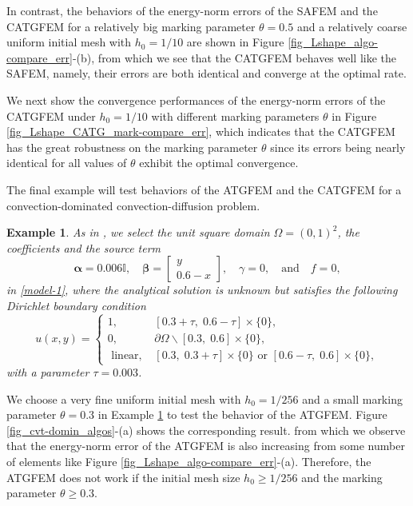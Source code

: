 \documentclass[preprint,times]{elsarticle}%
\newtheorem{example}{Example}[section]
\numberwithin{algorithm}{section}
\numberwithin{equation}{section}
\newcommand{\valpha}{\boldsymbol{\alpha}}
\newcommand{\vbeta}{\boldsymbol{\beta}}
\newcommand{\mbI}{\mathbb{I}}
\def\geq{\geqslant}
\begin{document}
In contrast, the behaviors of the energy-norm errors of the SAFEM and the CATGFEM for a relatively big marking parameter $\theta = 0.5$ and a relatively coarse uniform initial mesh with $h_0 = 1/10$ are shown in Figure \ref{fig_Lshape_algo-compare_err}-(b), from which we see that the CATGFEM behaves well like the SAFEM, namely, their errors are both identical and converge at the optimal rate.

We next show the convergence performances of the energy-norm errors of the CATGFEM under $h_0 = 1/10$ with different marking parameters $\theta$ in Figure \ref{fig_Lshape_CATG_mark-compare_err}, which indicates that the CATGFEM has the great robustness on the marking parameter $\theta$ since its errors being nearly identical for all values of $\theta$ exhibit the optimal convergence.



The final example will test behaviors of the ATGFEM and the CATGFEM for a convection-dominated convection-diffusion problem. 

	\begin{example}\label{test_cvt-domin}	
	As in \cite[Example 6.2]{ChenHXXuXJ10:4492}, we select the unit square domain $\Omega = (0,1)^2$, the coefficients and the source term 
		\begin{equation*}
			\valpha =0.006\mbI,
			\quad 
			\vbeta = \left[\begin{array}{c}
				y \\
				0.6-x
			\end{array}\right], 
			\quad
			\gamma = 0, \quad\text{and}\quad f = 0,   
		\end{equation*}
in \eqref{model-1}, where the analytical solution is unknown but satisfies the following Dirichlet boundary condition
$$
u(x, y)= \begin{cases}1, & [0.3+\tau,\;0.6-\tau]\times \{0\}, \\ 
	0, & \partial \Omega \backslash [0.3,\;0.6] \times \{0\}, \\ 
	\text { linear, } & [0.3,\;0.3+\tau]\times\{0\} \text { or }[0.6-\tau, \; 0.6] \times \{0\}, \end{cases}
$$
with a parameter $\tau = 0.003$.
\end{example}


We choose a very fine uniform initial mesh with $h_0 = 1/256$ and a small marking parameter $\theta = 0.3$ in Example \ref{test_cvt-domin} to test the behavior of the ATGFEM. Figure \ref{fig_cvt-domin_algos}-(a) shows the corresponding result. from which we observe that the energy-norm error of the ATGFEM is also increasing from some number of elements like Figure \ref{fig_Lshape_algo-compare_err}-(a). Therefore, the ATGFEM does not work if the initial mesh size $h_0 \geq 1/256$ and the marking parameter $\theta \geq 0.3$. 
\end{document}
